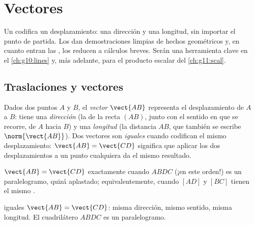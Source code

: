 \chapter{Vectores}\label{ch:g10:vectors}

Un  codifica un desplazamiento: una dirección y una longitud, sin
importar el punto de partida. Los  dan demostraciones limpias de
hechos geométricos y, en cuanto entran las , los reducen a
cálculos breves. Serán una herramienta clave en el \cref{ch:g10:lines} y,
más adelante, para el producto escalar del \cref{ch:g11:scal}.

\section{Traslaciones y vectores}

\begin{definition}[Vector]\label{def:g10:vectors:vector}
Dados dos puntos $A$ y $B$, el \emph{vector} $\vect{AB}$
representa el desplazamiento de $A$ a $B$: tiene una \emph{dirección} (la
de la recta $(AB)$, junto con el sentido en que se recorre, de $A$ hacia
$B$) y una \emph{longitud} (la distancia $AB$, que también se escribe
$\norm{\vect{AB}}$). Dos vectores son \emph{iguales} cuando codifican el
mismo desplazamiento: $\vect{AB} = \vect{CD}$ significa que aplicar los
dos desplazamientos a un punto cualquiera da el mismo resultado.
\end{definition}

\begin{proposition}\label{prop:g10:vectors:parallelogram}
$\vect{AB} = \vect{CD}$ exactamente cuando $ABDC$ (¡en este orden!) es un
paralelogramo, quizá aplastado; equivalentemente, cuando $[AD]$ y $[BC]$
tienen el mismo .
\end{proposition}
\admitted

\begin{omfigure}

{\small {} iguales $\vect{AB} = \vect{CD}$: misma dirección, mismo
sentido, misma longitud. El cuadrilátero $ABDC$ es un paralelogramo.}
\end{omfigure}

